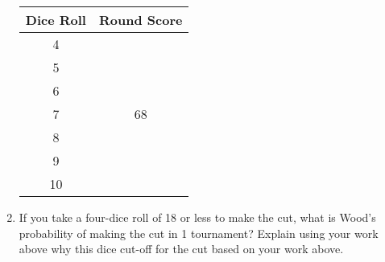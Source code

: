 \begin{enumerate}
		\begin{center} \Large
		\begin{tabular}{c|c}
		Dice Roll & Round Score\\\hline
		4 & \\\hline
		5 & \\\hline
		6 & \\\hline
		7 & 68\\\hline
		8 & \\\hline
		9 & \\\hline
		10 & \\\hline
		\end{tabular}
	\end{center}\normalsize
\item If you take a four-dice roll of 18 or less to make the cut, what is Wood's probability of making the cut in 1 tournament? Explain using your work above why this dice cut-off for the cut based on your work above.
\end{enumerate}